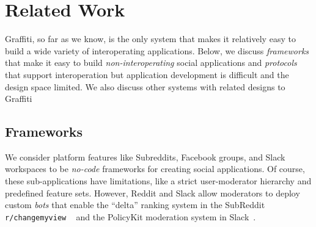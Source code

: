 \section{Related Work}

Graffiti, so far as we know, is the only system that makes it
relatively easy to build a wide variety of interoperating applications.
Below, we discuss \emph{frameworks} that make it easy to build
\emph{non-interoperating} social applications
and \emph{protocols} that support interoperation but
application development is difficult and the design space limited.
We also discuss other systems with related designs to Graffiti


\subsection{Frameworks}

We consider platform features like Subreddits, Facebook groups, and
Slack workspaces to be \emph{no-code} frameworks for creating social
applications.
Of course, these sub-applications have limitations,
like a strict user-moderator hierarchy
and predefined feature sets.
However, Reddit and Slack allow moderators to deploy
custom \emph{bots} that enable the
``delta'' ranking system in the SubReddit \texttt{r/changemyview}
~\cite{changemyview}
and the PolicyKit moderation system in Slack~\cite{policykit}.

